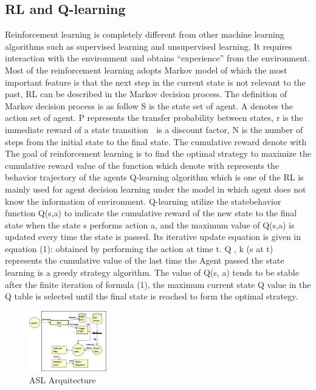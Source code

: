 \documentclass{article}
\begin{document}
\subsection{ RL and Q-learning}
Reinforcement learning is completely different from other
machine learning algorithms such as supervised learning and
unsupervised learning. It requires interaction with the
environment and obtains “experience” from the environment.
Most of the reinforcement learning adopts Markov model of
which the most important feature is that the next step in the
current state is not relevant to the past, RL can be described in the
Markov decision process. The definition of Markov decision
process is as follow S
is the state set of
agent. A
denotes the action set of agent.
P
represents the transfer
probability between states, r is the immediate reward of a state
transition 
is a discount factor, N is the number of steps
from the initial state to the final state. The cumulative reward
denote with The goal of reinforcement learning is to find
the optimal strategy to maximize the cumulative reward value of
the function which denote with represents the
behavior trajectory of the agents
Q-learning algorithm which is one of the RL is mainly used for
agent decision learning under the model in which agent does not
know the information of environment. Q-learning utilize the statebehavior function Q(s,a) to indicate the cumulative reward of the
new state to the final state when the state s performs action a, and the maximum value of Q(s,a) is updated every time the state is
passed. Its iterative update equation is given in equation (1):
obtained by performing the action at time t.
Q , k (s at t) represents
the cumulative value of the last time the Agent passed the state
learning is a greedy strategy algorithm. The value of Q(s, a) tends
to be stable after the finite iteration of formula (1), the maximum
current state Q value in the Q table is selected until the final state
is reached to form the optimal strategy.

\begin{figure}[h]
\centering
\includegraphics[width=0.3\textwidth]{fig1.png}
\caption{ASL Arquitecture}
\label{figura1}
\end{figure}
\end{document}
